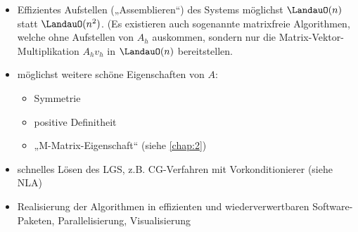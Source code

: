 \begin{nt*}
\begin{itemize}
		\item
			Effizientes Aufstellen („Assemblieren“) des Systems möglichst $\LandauO(n)$ statt $\LandauO(n^2)$.
			(Es existieren auch sogenannte matrixfreie Algorithmen, welche ohne Aufstellen von $A_h$ auskommen, sondern nur die Matrix-Vektor-Multiplikation $A_h v_h$ in $\LandauO(n)$ bereitstellen.
		\item
			möglichst weitere schöne Eigenschaften von $A$:
			\begin{itemize}
				\item
					Symmetrie
				\item
					positive Definitheit
				\item
					„M-Matrix-Eigenschaft“ (siehe \ref{chap:2})
			\end{itemize}
		\item
			schnelles Lösen des LGS, z.B. CG-Verfahren mit Vorkonditionierer (siehe NLA)
		\item
			Realisierung der Algorithmen in effizienten und wiederverwertbaren Software-Paketen, Parallelisierung, Visualisierung
	\end{itemize}
\end{nt*}


